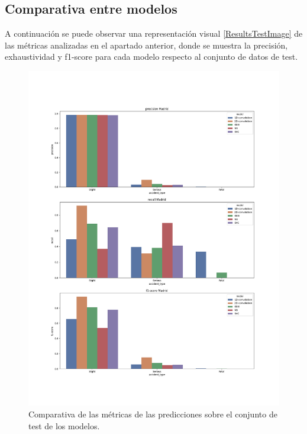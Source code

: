   \subsection{Comparativa entre modelos}

    A continuación se puede observar una representación visual \eqref{ResultsTestImage} de las métricas analizadas en el apartado anterior, donde se muestra la precisión, exhaustividad y f1-score para cada modelo respecto al conjunto de datos de test.

    \begin{figure}[H]
        \centering
        \includegraphics[width=13cm]{archivos/5.Resultados/ComparativaTest}
        \caption{Comparativa de las métricas de las predicciones sobre el conjunto de test de los modelos.}
        \label{ResultsTestImage}
     \end{figure}